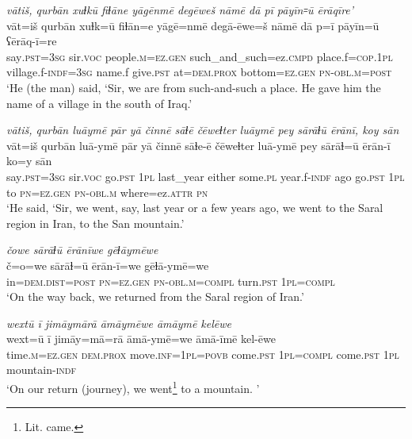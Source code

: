\ea \label{ZQ.5}
\textit{vātiš, qurbān xuɫkū fiɫāne yāgēnmē degēweš nāmē dā pī pāyīn꞊ū ērāqīre'} \\ 
\gll vāt=iš qurbān xuɫk=ū fiɫān=e yāgē=nmē degā-ēwe=š nāmē dā p=ī pāyīn=ū ʕērāq-ī=re \\ 
 say\textsc{.pst}\textsc{=3sg} sir.\textsc{voc} people\textsc{.m}\textsc{=ez.gen} such\_and\_such=ez\textsc{.cmpd} place.f\textsc{=cop}\textsc{.\textsc{1pl}} village.f\textsc{-indf}\textsc{=3sg} name.f give\textsc{.pst} at=\textsc{dem.prox} bottom\textsc{=ez.gen} \textsc{pn}\textsc{-obl}\textsc{.m}\textsc{=\textsc{post}} \\ 
\glt `He (the man) said, ‘Sir, we are from such-and-such a place. He gave him the name of a village in the south of Iraq.'
\z 
 
\ea \label{ZQ.9}
\textit{vātiš, qurbān luāymē pār yā činnē sāɫē čēweɫter luāymē pey sārāɫū ērānī, koy sān} \\ 
\gll vāt=iš qurbān luā-ymē pār yā činnē sāɫe-ē čēweɫter luā-ymē pey sārāɫ=ū ērān-ī ko=y sān \\ 
 say\textsc{.pst}\textsc{=3sg} sir.\textsc{voc} go\textsc{.pst} \textsc{1pl} last\_year either some\textsc{.pl} year.f\textsc{-indf} ago go\textsc{.pst} \textsc{1pl} to \textsc{pn}\textsc{=ez.gen} \textsc{pn}\textsc{-obl}\textsc{.m} where=ez.\textsc{attr} \textsc{pn} \\ 
\glt `He said, ‘Sir, we went, say, last year or a few years ago, we went to the Saral region in Iran, to the San mountain.'
\z 
 
\ea \label{ZQ.10}
\textit{čowe sārāɫū ērānīwe gēɫāymēwe} \\ 
\gll č=o=we sārāɫ=ū ērān-ī=we gēɫā-ymē=we \\ 
 in=\textsc{dem.dist}\textsc{=\textsc{post}} \textsc{pn}\textsc{=ez.gen} \textsc{pn}\textsc{-obl}\textsc{.m}\textsc{=compl} turn\textsc{.pst} \textsc{1pl}\textsc{=compl} \\ 
\glt `On the way back, we returned from the Saral region of Iran.'
\z 
 
\ea \label{ZQ.11}
\textit{wextū ī jimāymārā āmāymēwe āmāymē kelēwe} \\ 
\gll wext=ū ī jimāy=mā=rā āmā-ymē=we āmā-īmē kel-ēwe \\ 
 time\textsc{.m}\textsc{=ez.gen} \textsc{dem.prox} move\textsc{.inf}\textsc{=\textsc{1pl}}\textsc{=\textsc{povb}} come\textsc{.pst} \textsc{1pl}\textsc{=compl} come\textsc{.pst} \textsc{1pl} mountain\textsc{-indf} \\ 
\glt `On our return (journey), we went\footnote{Lit. came.}  to a mountain. '
\z 
 
